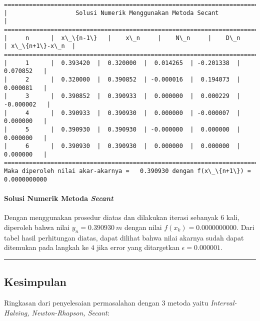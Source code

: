 \documentclass[11pt]{article}
\begin{document}
    \begin{Verbatim}[commandchars=\\\{\}]
=================================================================================
|                   Solusi Numerik Menggunakan Metoda Secant                    |
=================================================================================
|     n      |  x\_\{n-1\}   |    x\_n     |    N\_n     |    D\_n     | x\_\{n+1\}-x\_n  |
=================================================================================
|     1      |  0.393420  |  0.320000  |  0.014265  | -0.201338  |   0.070852   |
|     2      |  0.320000  |  0.390852  | -0.000016  |  0.194073  |   0.000081   |
|     3      |  0.390852  |  0.390933  |  0.000000  |  0.000229  |  -0.000002   |
|     4      |  0.390933  |  0.390930  |  0.000000  | -0.000007  |   0.000000   |
|     5      |  0.390930  |  0.390930  | -0.000000  |  0.000000  |   0.000000   |
|     6      |  0.390930  |  0.390930  |  0.000000  |  0.000000  |   0.000000   |
=================================================================================
Maka diperoleh nilai akar-akarnya =   0.390930 dengan f(x\_\{n+1\}) =    0.0000000000

    \end{Verbatim}

    \paragraph{\texorpdfstring{Solusi Numerik Metoda
\emph{Secant}}{Solusi Numerik Metoda Secant}}\label{solusi-numerik-metoda-secant}

Dengan menggunakan prosedur diatas dan dilakukan iterasi sebanyak \(6\)
kali, diperoleh bahwa nilai \(y_n = 0.390930\ m\) dengan nilai
\(f(x_k) = 0.0000000000\). Dari tabel hasil perhitungan diatas, dapat
dilihat bahwa nilai akarnya sudah dapat ditemukan pada langkah ke \(4\)
jika error yang ditargetkan \(\epsilon = 0.000001\).

    \begin{center}\rule{0.5\linewidth}{\linethickness}\end{center}

\subsection{Kesimpulan}\label{kesimpulan}

Ringkasan dari penyelesaian permasalahan dengan 3 metoda yaitu
\emph{Interval-Halving, Newton-Rhapson, Secant}:
\end{document}

